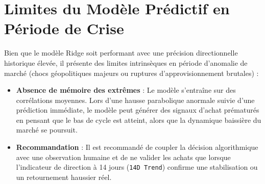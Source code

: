 \documentclass[12pt,a4paper]{article}
\begin{document}
\section{Limites du Modèle Prédictif en Période de Crise}
Bien que le modèle Ridge soit performant avec une précision directionnelle historique élevée, il présente des limites intrinsèques en période d'anomalie de marché (chocs géopolitiques majeurs ou ruptures d'approvisionnement brutales) :
\begin{itemize}
    \item \textbf{Absence de mémoire des extrêmes} : Le modèle s'entraîne sur des corrélations moyennes. Lors d'une hausse parabolique anormale suivie d'une prédiction immédiate, le modèle peut générer des signaux d'achat prématurés en pensant que le bas de cycle est atteint, alors que la dynamique baissière du marché se poursuit.
    \item \textbf{Recommandation} : Il est recommandé de coupler la décision algorithmique avec une observation humaine et de ne valider les achats que lorsque l'indicateur de direction à 14 jours (\texttt{14D Trend}) confirme une stabilisation ou un retournement haussier réel.
\end{itemize}
\end{document}
